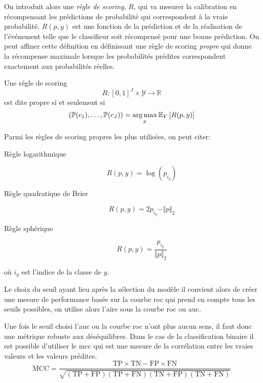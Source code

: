 On introduit alors une \emph{règle de scoring}, $R$, qui va mesurer la calibration en récompensant les prédictions de probabilité qui correspondent à la vraie probabilité. $R (p, y)$ est une fonction de la prédiction et de la réalisation de l'événement telle que le classifieur soit récompensé pour une bonne prédiction. On peut affiner cette définition en définissant une règle de scoring \emph{propre} qui donne la récompense maximale lorsque les probabilités prédites correspondent exactement aux probabilités réelles.
\begin{definition}
    Une régle de scoring
    \begin{equation*}
        R : [0,1]^J \times \mathcal{Y} \rightarrow \mathbb{R}
    \end{equation*}
    est dite propre si et seulement si
    \begin{equation*}
        \left( \mathbb{P}(c_1),\dotsc,\mathbb{P}(c_J)\right) = \operatorname*{arg\,max}_p \mathbb{E}_Y \left[ R(p,y) \right]
    \end{equation*}
\end{definition}

Parmi les règles de scoring propres les plus utilisées, on peut citer:
\begin{description}
    \item[Règle logarithmique] \begin{equation*}
        R(p,y) = \log ( p_{i_y} )
    \end{equation*}
    \item[Règle quadratique de Brier] \begin{equation*}
        R(p,y) = 2 p_{i_y} - \Vert p \Vert_2
    \end{equation*}
    \item[Règle sphérique] \begin{equation*}
        R(p,y) = \frac{p_{i_y}}{\Vert p \Vert_2}
    \end{equation*}
\end{description}
où $i_y$ est l'indice de la classe de $y$.


Le choix du seuil ayant lieu après la sélection du modèle il convient alors de créer une mesure de performance basée sur la courbe \ac{roc} qui prend en compte tous les seuils possibles, on utilise alors l'aire sous la courbe \ac{roc} ou \ac{auc}.

Une fois le seuil choisi l'\ac{auc} ou la courbe \ac{roc} n'ont plus aucun sens, il faut donc une métrique robuste aux déséquilibres. Dans le cas de la classification binaire il est possible d'utiliser le \ac{mcc} qui est une mesure de la corrélation entre les vraies valeurs et les valeurs prédites.
\begin{equation*}
    \mathrm{MCC} = \frac{\mathrm{TP}\times\mathrm{TN} - \mathrm{FP}\times\mathrm{FN}}{\sqrt{ (\mathrm{TP}+\mathrm{FP}) ( \mathrm{TP} + \mathrm{FN} ) ( \mathrm{TN} + \mathrm{FP} ) ( \mathrm{TN} + \mathrm{FN}) }}
\end{equation*}

